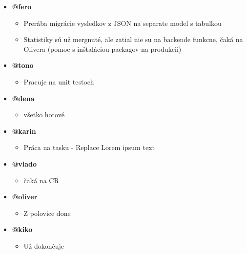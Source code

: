 \documentclass{article}
\begin{document}
    \begin{itemize}
        \item \textbf {@fero}
        \begin{itemize}
            \item Prerába migrácie vysledkov z JSON na separate model s tabulkou
            \item Statistiky sú už mergnuté, ale zatial nie su na backende funkcne, čaká na Olivera (pomoc s inštaláciou packagov  na produkcii)
        \end{itemize}
        \item \textbf {@tono}
        \begin{itemize}
            \item Pracuje na unit testoch
        \end{itemize}
        \item \textbf {@dena}
        \begin{itemize}
            \item  všetko hotové
        \end{itemize}
        \item \textbf {@karin}
        \begin{itemize}
            \item Práca na tasku - Replace Lorem ipsum text 
        \end{itemize}
        \item \textbf {@vlado}
        \begin{itemize}
            \item čaká na CR
        \end{itemize}
        \item \textbf {@oliver}
        \begin{itemize}
            \item Z polovice done
        \end{itemize}
        \item \textbf {@kiko}
        \begin{itemize}
            \item Už dokončuje
        \end{itemize}
    \end{itemize}    
\end{document}
